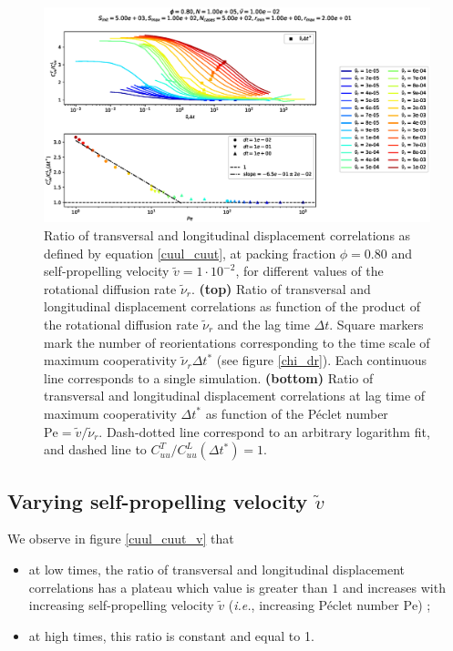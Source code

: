 \documentclass[class=report, float=false, crop=false]{standalone}
\begin{document}
\begin{figure}[h!]
\centering
\includegraphics[width=\textwidth]{figures/figs/CuuLCuuT_Dk8000_Vj1000_Nq1000_Io5000_Mn1000_Cn5000.eps}
\caption{Ratio of transversal and longitudinal displacement correlations as defined by equation \ref{cuul_cuut}, at packing fraction $\phi=0.80$ and self-propelling velocity $\tilde{v}=1\cdot10^{-2}$, for different values of the rotational diffusion rate $\tilde{\nu}_r$. \textbf{(top)} Ratio of transversal and longitudinal displacement correlations as function of the product of the rotational diffusion rate $\tilde{\nu}_r$ and the lag time $\Delta t$. Square markers mark the number of reorientations corresponding to the time scale of maximum cooperativity $\tilde{\nu}_r \Delta t^*$ (see figure \ref{chi_dr}). Each continuous line corresponds to a single simulation. \textbf{(bottom)} Ratio of transversal and longitudinal displacement correlations at lag time of maximum cooperativity $\Delta t^*$ as function of the P\'eclet number $\text{Pe}=\tilde{v}/\tilde{\nu}_r$. Dash-dotted line correspond to an arbitrary logarithm fit, and dashed line to $C_{uu}^T/C_{uu}^L(\Delta t^*) = 1$.}
\label{cuul_cuut_dr}
\end{figure}

\subsection{Varying self-propelling velocity $\tilde{v}$}

We observe in figure \ref{cuul_cuut_v} that
\begin{itemize}
  \item at low times, the ratio of transversal and longitudinal displacement correlations has a plateau which value is greater than $1$ and increases with increasing self-propelling velocity $\tilde{v}$ (\textit{i.e.}, increasing P\'eclet number $\text{Pe}$) ;
  \item at high times, this ratio is constant and equal to 1.\\
\end{itemize}
\end{document}
